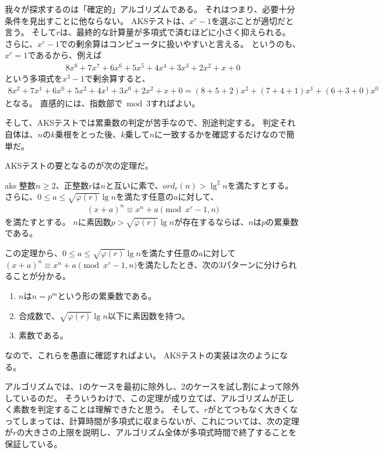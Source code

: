 我々が探求するのは「確定的」アルゴリズムである。
それはつまり、必要十分条件を見出すことに他ならない。
AKSテストは、$x^r-1$を選ぶことが適切だと言う。
そして$r$は、最終的な計算量が多項式で済むほどに小さく抑えられる。
さらに、$x^r-1$での剰余算はコンピュータに扱いやすいと言える。
というのも、$x^r=1$であるから、例えば
\begin{align*}
8x^8 + 7x^7 + 6x^6 + 5x^5 + 4x^4 + 3x^3 + 2x^2 + x + 0
\end{align*}
という多項式を$x^3-1$で剰余算すると、
\begin{align*}
8x^2 + 7x^1 + 6x^0 + 5x^2 + 4x^1 + 3x^0 + 2x^2 + x + 0 = (8 + 5 + 2)x^2 + (7 + 4 + 1)x^1 + (6 + 3 + 0)x^0
\end{align*}
となる。
直感的には、指数部で$\bmod{3}$すればよい。

そして、AKSテストでは累乗数の判定が苦手なので、別途判定する。
判定それ自体は、$n$の$k$乗根をとった後、$k$乗して$n$に一致するかを確認するだけなので簡単だ。


AKSテストの要となるのが次の定理だ。

\begin{Theo}{}{aks}
整数$n\ge2$、正整数$r$は$n$と互いに素で、$ord_r(n)>\lg^2{n}$を満たすとする。
さらに、$0\le a \le\sqrt{\varphi(r)}\lg{n}$を満たす任意の$a$に対して、
\begin{align*}
(x+a)^n \equiv x^n + a \pmod{x^r-1, n}
\end{align*}
を満たすとする。
$n$に素因数$p>\sqrt{\varphi(r)}\lg{n}$が存在するならば、$n$は$p$の累乗数である。
\end{Theo}

この定理から、$0\le a \le\sqrt{\varphi(r)}\lg{n}$を満たす任意の$a$に対して$(x+a)^n \equiv x^n + a \pmod{x^r-1, n}$を満たしたとき、次の3パターンに分けられることが分かる。
\begin{enumerate}
 \item $n$は$n=p^m$という形の累乗数である。
 \item 合成数で、$\sqrt{\varphi(r)}\lg{n}$以下に素因数を持つ。
 \item 素数である。
\end{enumerate}

なので、これらを愚直に確認すればよい。
AKSテストの実装は次のようになる。


アルゴリズムでは、1のケースを最初に除外し、2のケースを試し割によって除外しているのだ。
そういうわけで、この定理が成り立てば、アルゴリズムが正しく素数を判定することは理解できたと思う。
そして、$r$がとてつもなく大きくなってしまっては、計算時間が多項式に収まらないが、これについては、次の定理が$r$の大きさの上限を説明し、アルゴリズム全体が多項式時間で終了することを保証している。

